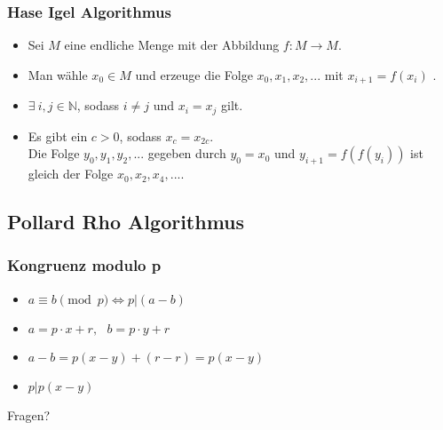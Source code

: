 \documentclass[mathserif, compress, german]{beamer}
\begin{document}
\begin{frame}
  \frametitle{Hase Igel Algorithmus}
  \begin{itemize}
    \item<2-> Sei $M$ eine endliche Menge mit der Abbildung $f : M \rightarrow M$.
      \vspace{3mm}
    \item<3-> Man w\"ahle $x_0 \in M$ und erzeuge die Folge $x_0, x_1, x_2,...$ mit $x_{i+1} = f(x_i)$ .
      \vspace{3mm}
    \item<4-> $\exists \ i,j \in \mathbb{N}$, sodass $i \not= j$ und $x_i = x_j$ gilt.
      \vspace{3mm}
    \item<5-> Es gibt ein $c>0$, sodass $x_c=x_{2c}$.\\
              Die Folge $y_0, y_1, y_2,...$ gegeben durch $y_0=x_0$ und $y_{i+1}=f(f(y_i))$ ist gleich der Folge $x_0,x_2,x_4,...$.
  \end{itemize}
\end{frame}


\subsection{Pollard Rho Algorithmus}

\begin{frame}
  \frametitle{Kongruenz modulo p}
  \begin{itemize}
	\item<1->$a \equiv b \pmod p \Leftrightarrow p|(a-b)$
\vspace{3mm}
	\item<2->$a=p\cdot x +r,\ \ \ b= p\cdot y +r$
\vspace{3mm}
	\item<3->$a-b=p(x-y)+(r-r)=p(x-y)$
\vspace{3mm}
	\item<4->$p|p(x-y)$
  \end{itemize}
\end{frame}

\begin{frame}
\centering Fragen?
\end{frame}
\end{document}
